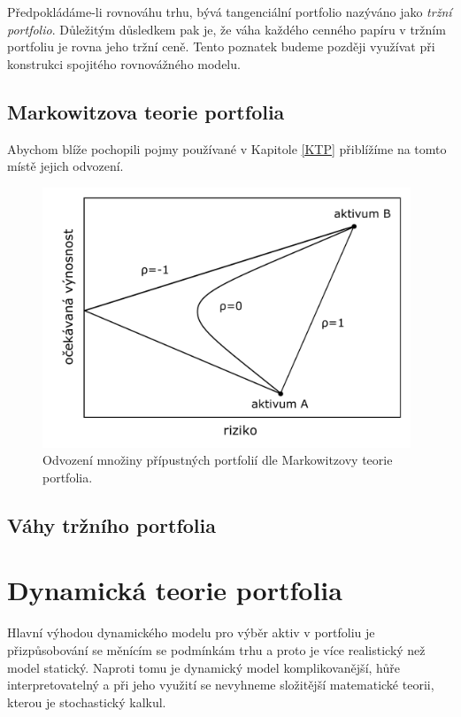 \documentclass[a4paper,12pt]{report}
\theoremstyle{definition} \newtheorem{definice}[veta]{Definice}
\theoremstyle{remark}
\begin{document}
Předpokládáme-li rovnováhu trhu, bývá tangenciální portfolio nazýváno jako \textit{tržní portfolio}.
Důležitým důsledkem pak je, že váha každého cenného papíru v tržním portfoliu je rovna jeho tržní ceně. \label{vahy_trznihodnota}
Tento poznatek budeme později využívat při konstrukci spojitého rovnovážného modelu.

\subsection{Markowitzova teorie portfolia}\label{Markowitz_kap}

Abychom blíže pochopili pojmy používané v Kapitole \ref{KTP} přiblížíme na tomto místě jejich odvození.

\begin{figure}[!htbp]
  \centering 
  \includegraphics[width=11cm]{IMG/pripustna_portfolia.pdf}
  \caption{Odvození množiny přípustných portfolií  dle Markowitzovy teorie portfolia.}
\end{figure}

\subsection{Váhy tržního portfolia}\label{vahy_kap}



\section{Dynamická teorie portfolia}
Hlavní výhodou dynamického modelu pro výběr aktiv v portfoliu je přizpůsobování se měnícím se podmínkám trhu a proto je více realistický než model statický.
Naproti tomu je dynamický model komplikovanější, hůře interpretovatelný a při jeho využití se nevyhneme složitější matematické teorii, kterou je stochastický kalkul.
\end{document}

